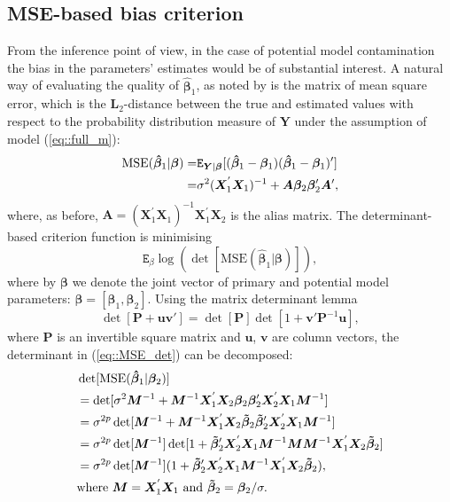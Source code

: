 \subsection{MSE-based bias criterion}
From the inference point of view, in the case of potential model contamination the bias in the parameters' estimates would be of substantial interest. A natural way of evaluating the quality of $\bm{\hat{\beta}}_{1}$, as noted by \citet{FedorovMontepiedra1997} is the matrix of  mean square error, which is the $\bm{L}_2$-distance between the true and estimated values with respect to the probability distribution measure of $\bm{Y}$ under the assumption of model (\ref{eq::full_m}):
\begin{align}
\label{eq::MSE}
\mbox{MSE}(\bm{\hat{\beta}}_1|\bm{\beta})=&\mathtt{E}_{\bm{Y}|\bm{\beta}}[(\bm{\hat{\beta}}_1-\bm{\beta}_1)(\bm{\hat{\beta}}_1-\bm{\beta}_1)']\notag\\=&\sigma^2(\bm{X}_1^{'}\bm{X}_1)^{-1}+\bm{A}\bm{\beta}_2\bm{\beta}_2'\bm{A}', 
\end{align}
where, as before, $\bm{A}=(\bm{X}_1^{'}\bm{X}_1)^{-1}\bm{X}_1^{'}\bm{X}_2$ is the alias matrix.
The determinant-based criterion function is minimising
\begin{equation}
\label{eq::MSE_det}
\mathtt{E}_{\beta}\log(\det[\mbox{MSE}(\bm{\hat{\beta}}_1|\bm{\beta})]),
\end{equation}
where by $\bm{\beta}$ we denote the joint vector of primary and potential model parameters: $\bm{\beta}=[\bm{\beta}_1, \bm{\beta}_2]$.
Using the matrix determinant lemma \citep{Harville2006matrix}
\begin{equation*}
\det[\bm{P}+\bm{uv}']=\det[\bm{P}]\det[1+\bm{v'}\bm{P}^{-1}\bm{u}], 
\end{equation*}
where $\bm{P}$ is an invertible square matrix and $\bm{u}$, $\bm{v}$ are column vectors, the determinant in (\ref{eq::MSE_det}) can be decomposed:
\begin{align}
\label{eq::mse_det_dec}
&\det[\mbox{MSE}(\bm{\hat{\beta}}_1|\bm{\beta}_2)]\notag\\&=\det[\sigma^2\bm{M}^{-1}+\bm{M}^{-1}\bm{X}_1^{'}\bm{X}_2\bm{\beta}_2\bm{\beta}_2'\bm{X}_2^{'}\bm{X}_1\bm{M}^{-1}]\notag\\&=\sigma^{2p}\det[\bm{M}^{-1}+\bm{M}^{-1}\bm{X}_1^{'}\bm{X}_2\bm{\tilde{\beta}}_2\bm{\tilde{\beta}}_2'\bm{X}_2^{'}\bm{X}_1\bm{M}^{-1}]\notag\\&=\sigma^{2p}\det[\bm{M}^{-1}]\det[1+\bm{\tilde{\beta}}_2'\bm{X}_2^{'}\bm{X}_1\bm{M}^{-1}\bm{M}\bm{M}^{-1}\bm{X}_1^{'}\bm{X}_2\bm{\tilde{\beta}}_2]\notag\\&=\sigma^{2p}\det[\bm{M}^{-1}](1+\bm{\tilde{\beta}}_2'\bm{X}_2^{'}\bm{X}_1\bm{M}^{-1}\bm{X}_1^{'}\bm{X}_2\bm{\tilde{\beta}}_2),\\
&\mbox{where } \bm{M}=\bm{X}_1^{'}\bm{X}_1 \mbox{ and }\bm{\tilde{\beta}}_2=\bm{\beta}_2/\sigma. \notag
\end{align}
